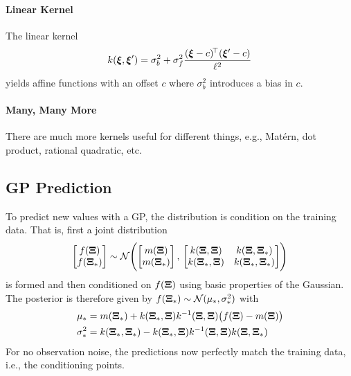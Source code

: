 			\paragraph{Linear Kernel}
				The linear kernel
				\begin{equation}
					k(\bm{\xi}, \bm{\xi}') = \sigma_b^2 + \sigma_f^2 \frac{(\bm{\xi} - c)^{\!\top} (\bm{\xi}' - c)}{\ell^2}
				\end{equation}
				yields affine functions with an offset \(c\) where \( \sigma_b^2 \) introduces a bias in \(c\).

			\paragraph{Many, Many More}
				There are much more kernels useful for different things, e.g., Matérn, dot product, rational quadratic, etc.

		\subsection{GP Prediction}
			To predict new values with a GP, the distribution is condition on the training data. That is, first a joint distribution
			\begin{equation}
				\begin{bmatrix}
					f(\bm{\mathrm{\Xi}}) \\
					f(\bm{\mathrm{\Xi}}_\ast)
				\end{bmatrix}
				\sim
				\mathcal{N}\Biggl(
				\begin{bmatrix}
						m(\bm{\mathrm{\Xi}}) \\
						m(\bm{\mathrm{\Xi}}_\ast)
					\end{bmatrix},\,
				\begin{bmatrix}
						k(\bm{\mathrm{\Xi}}, \bm{\mathrm{\Xi}})      & k(\bm{\mathrm{\Xi}}, \bm{\mathrm{\Xi}}_\ast)      \\
						k(\bm{\mathrm{\Xi}}_\ast, \bm{\mathrm{\Xi}}) & k(\bm{\mathrm{\Xi}}_\ast, \bm{\mathrm{\Xi}}_\ast)
					\end{bmatrix}
				\Biggr)
			\end{equation}
			is formed and then conditioned on \( f(\bm{\mathrm{\Xi}}) \) using basic properties of the Gaussian. The posterior is therefore given by \( f(\bm{\mathrm{\Xi}}_\ast) \sim \mathcal{N}(\mu_\ast, \sigma_\ast^2) \) with
			\begin{align}
				\mu_\ast      & = m(\bm{\mathrm{\Xi}}_\ast) + k(\bm{\mathrm{\Xi}}_\ast, \bm{\mathrm{\Xi}}) k^{-1}(\bm{\mathrm{\Xi}}, \bm{\mathrm{\Xi}}) \bigl( f(\bm{\mathrm{\Xi}}) - m(\bm{\mathrm{\Xi}}) \bigr)    \\
				\sigma_\ast^2 & = k(\bm{\mathrm{\Xi}}_\ast, \bm{\mathrm{\Xi}}_\ast) - k(\bm{\mathrm{\Xi}}_\ast, \bm{\mathrm{\Xi}}) k^{-1}(\bm{\mathrm{\Xi}}, \bm{\mathrm{\Xi}}) k(\bm{\mathrm{\Xi}}, \bm{\mathrm{\Xi}}_\ast)
			\end{align}
			For no observation noise, the predictions now perfectly match the training data, i.e., the conditioning points.

